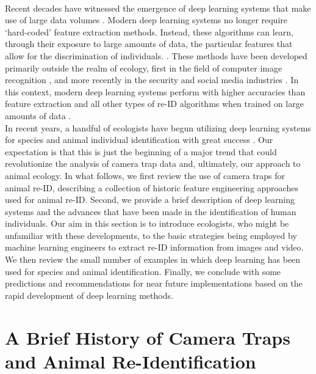 \documentclass[11pt]{article}
\begin{document}
\newline
\\ 
Recent decades have witnessed the emergence of deep learning systems that make use of large data volumes \cite{zheng2015scalable}. Modern deep learning systems no longer require `hard-coded' feature extraction methods. Instead, these algorithms can learn, through their exposure to large amounts of data, the particular features that allow for the discrimination of individuals. \cite{lecun2015deep}. These methods have been developed primarily outside the realm of ecology, first in the field of computer image recognition \cite{krizhevsky2012imagenet}, and more recently in the security and social media industries \cite{zheng2015scalable}. In this context, modern deep learning systems perform with higher accuracies than feature extraction and all other types of re-ID algorithms when trained on large amounts of data \cite{li2014deepreid, lisanti2015person, martinel2015re, zheng2016mars, xiaoend}. 
\newline
\\
In recent years, a handful of ecologists have begun utilizing deep learning systems for species and animal individual identification with great success \cite{norouzzadehautomatically, schneider2018deep, carter2014automated, freytag2016chimpanzee, brust2017towards, loos2013automated}. Our expectation is that this is just the beginning of a major trend that could revolutionize the analysis of camera trap data and, ultimately, our approach to animal ecology. In what follows, we first review the use of camera traps for animal re-ID, describing a collection of historic feature engineering approaches used for animal re-ID. Second, we provide a brief description of deep learning systems and the advances that have been made in the identification of human individuals. Our aim in this section is to introduce ecologists, who might be unfamiliar with these developments, to the basic strategies being employed by machine learning engineers to extract re-ID information from images and video. We then review the small number of examples in which deep learning has been used for species and animal identification. Finally, we conclude with some predictions and recommendations for near future implementations based on the rapid development of deep learning methods.

\section*{A Brief History of Camera Traps and Animal Re-Identification}
\end{document}
